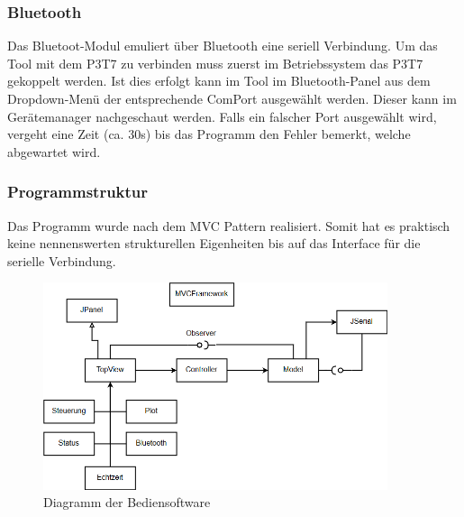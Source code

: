 \subsubsection*{Bluetooth}

Das Bluetoot-Modul emuliert über Bluetooth eine seriell Verbindung. Um das Tool mit dem P3T7 zu verbinden muss zuerst im Betriebssystem das P3T7 gekoppelt werden.  Ist dies erfolgt kann im Tool im Bluetooth-Panel aus dem Dropdown-Menü der entsprechende ComPort ausgewählt werden. Dieser kann im Gerätemanager nachgeschaut werden. Falls ein falscher Port ausgewählt wird, vergeht eine Zeit (ca. 30s) bis das Programm den Fehler bemerkt, welche abgewartet wird.


\subsubsection*{Programmstruktur}

Das Programm wurde nach dem MVC Pattern realisiert. Somit hat es praktisch keine nennenswerten strukturellen Eigenheiten bis auf das Interface für die serielle Verbindung. 

\begin{figure}[H]
\begin{center}
\includegraphics[width=0.9\textwidth]{images/Software_UML.png}
\caption{Diagramm der Bediensoftware}
\end{center}
\end{figure}
